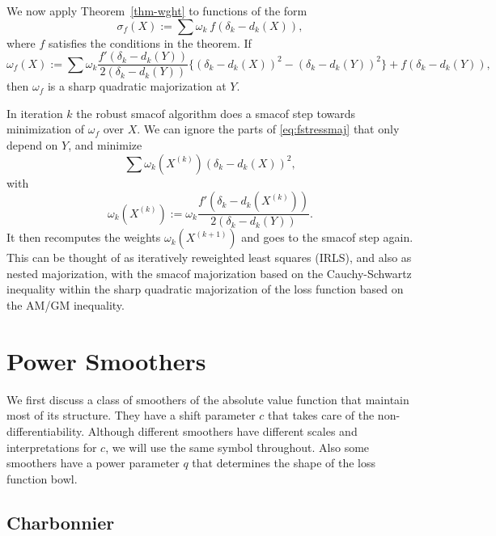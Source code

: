 \documentclass[
  12pt,
  letterpaper,
  DIV=11,
  numbers=noendperiod]{scrartcl}
\newcommand{\sectionbreak}{\pagebreak}
\theoremstyle{definition}
\theoremstyle{plain}
\theoremstyle{plain}
\theoremstyle{remark}
\begin{document}
We now apply Theorem~\ref{thm-wght} to functions of the form
\begin{equation}
\sigma_f(X):=\sum \omega_k\ f(\delta_k-d_k(X)),\label{eq:fstressdef}
\end{equation} where \(f\) satisfies the conditions in the theorem. If
\begin{equation}
\omega_f(X):=\sum \omega_k\frac{f'(\delta_k-d_k(Y))}{2(\delta_k-d_k(Y))}\{(\delta_k-d_k(X))^2-(\delta_k-d_k(Y))^2\}+f(\delta_k-d_k(Y)),\label{eq:fstressmaj}
\end{equation} then \(\omega_f\) is a sharp quadratic majorization at
\(Y\).

In iteration \(k\) the robust smacof algorithm does a smacof step
towards minimization of \(\omega_f\) over \(X\). We can ignore the parts
of \eqref{eq:fstressmaj} that only depend on \(Y\), and minimize
\begin{equation}
\sum \omega_k(X^{(k)})(\delta_k-d_k(X))^2,\label{eq:fstressaux}
\end{equation} with \begin{equation}
\omega_k(X^{(k)}):=\omega_k\frac{f'(\delta_k-d_k(X^{(k)}))}{2(\delta_k-d_k(Y))}.\label{eq:wkdef}
\end{equation} It then recomputes the weights \(\omega_k(X^{(k+1)})\)
and goes to the smacof step again. This can be thought of as iteratively
reweighted least squares (IRLS), and also as nested majorization, with
the smacof majorization based on the Cauchy-Schwartz inequality within
the sharp quadratic majorization of the loss function based on the AM/GM
inequality.

\sectionbreak

\section{Power Smoothers}\label{power-smoothers}

We first discuss a class of smoothers of the absolute value function
that maintain most of its structure. They have a shift parameter \(c\)
that takes care of the non-differentiability. Although different
smoothers have different scales and interpretations for \(c\), we will
use the same symbol throughout. Also some smoothers have a power
parameter \(q\) that determines the shape of the loss function bowl.

\subsection{Charbonnier}\label{sec-charb}
\end{document}
